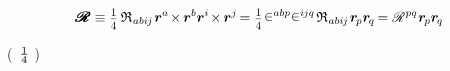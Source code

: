 \begin{otherlanguage}{russian}
\begin{equation*}
\hspace{.1ex}\pmb{\scalebox{1.2}[1]{$\mathscr{R}$}} \equiv
\smalldisplaystyleonefourth \hspace{.4ex} \mathfrak{R}_{\hspace{.1ex}abi\hspace{-0.1ex}j} \hspace{.2ex} \bm{r}^a \hspace{-0.3ex} \times \hspace{-0.15ex} \bm{r}^b \bm{r}^i \hspace{-0.3ex} \times \hspace{-0.15ex} \bm{r}^j \hspace{-0.25ex}
= \smalldisplaystyleonefourth \hspace{.15ex} \levicivita^{abp} \levicivita^{i\hspace{-0.1ex}jq} \hspace{.25ex} \mathfrak{R}_{\hspace{.1ex}abi\hspace{-0.1ex}j} \hspace{.2ex} \bm{r}_{\hspace{-0.2ex}p} \bm{r}_{\hspace{-0.2ex}q} \hspace{-0.2ex}
= \mathscr{R}^{\hspace{.1ex}pq} \hspace{.1ex} \bm{r}_{\hspace{-0.2ex}p} \bm{r}_{\hspace{-0.2ex}q}
\end{equation*}

\vspace{-0.2em} \noindent (~$\onefourth$ ) 


\end{otherlanguage}
